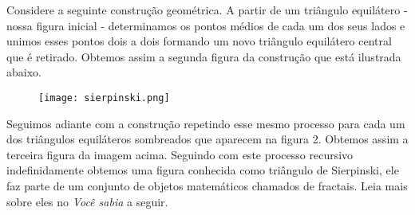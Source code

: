 \documentclass[10 pt,usenames,dvipsnames, oneside]{article}
\begin{document}
Considere a seguinte construção geométrica. A partir de um triângulo equilátero - nossa figura inicial - determinamos os pontos médios de cada um dos seus lados e unimos esses pontos dois a dois formando um novo triângulo equilátero central que é retirado. Obtemos assim a segunda figura da construção que está ilustrada abaixo.

\begin{figure}[H]
\centering
\texttt{[image: sierpinski.png]}
\end{figure}

Seguimos adiante com a construção repetindo esse mesmo processo para cada um dos triângulos equiláteros sombreados que aparecem na figura 2. Obtemos assim a terceira figura da imagem acima. Seguindo com este processo recursivo indefinidamente obtemos uma figura conhecida como triângulo de Sierpinski, ele faz parte de um conjunto de objetos matemáticos chamados de fractais. Leia mais sobre eles no \textit{Você sabia} a seguir.
\end{document}
